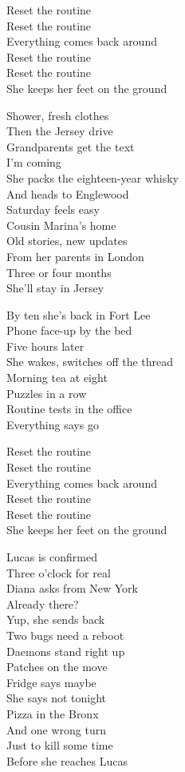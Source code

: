 \begin{lyrics}
Reset the routine\\
Reset the routine\\
Everything comes back around\\
Reset the routine\\
Reset the routine\\
She keeps her feet on the ground

Shower, fresh clothes\\
Then the Jersey drive\\
Grandparents get the text\\
I’m coming\\
She packs the eighteen-year whisky\\
And heads to Englewood\\
Saturday feels easy\\
Cousin Marina’s home\\
Old stories, new updates\\
From her parents in London\\
Three or four months\\
She’ll stay in Jersey

By ten she’s back in Fort Lee\\
Phone face-up by the bed\\
Five hours later\\
She wakes, switches off the thread\\
Morning tea at eight\\
Puzzles in a row\\
Routine tests in the office\\
Everything says go

Reset the routine\\
Reset the routine\\
Everything comes back around\\
Reset the routine\\
Reset the routine\\
She keeps her feet on the ground

Lucas is confirmed\\
Three o’clock for real\\
Diana asks from New York\\
Already there?\\
Yup, she sends back\\
Two bugs need a reboot\\
Daemons stand right up\\
Patches on the move\\
Fridge says maybe\\
She says not tonight\\
Pizza in the Bronx\\
And one wrong turn\\
Just to kill some time\\
Before she reaches Lucas
\end{lyrics}

